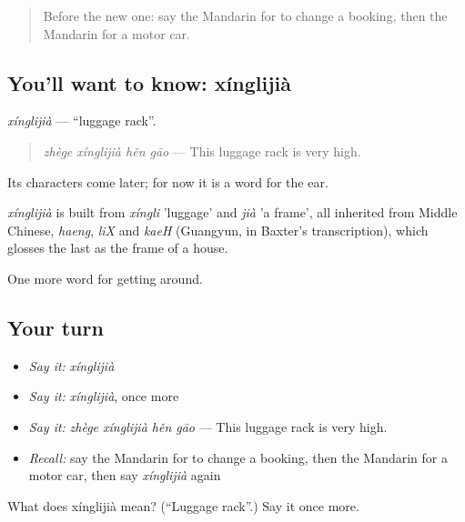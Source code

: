 \label{lesson:ZH-C406-xinglijia}



\begin{quote}
Before the new one: say the Mandarin for to change a booking, then the Mandarin for a motor car.
\end{quote}

\subsection*{You'll want to know: xínglijià}
\emph{xínglijià} — \textquotedblleft{}luggage rack\textquotedblright{}.

\begin{quote}
\emph{zhège xínglijià hěn gāo} — This luggage rack is very high.
\end{quote}

Its characters come later; for now it is a word for the ear.

\begin{cousinweb}
\emph{xínglijià} is built from \emph{xíngli} 'luggage' and \emph{jià} 'a frame', all inherited from Middle Chinese, \emph{haeng}, \emph{liX} and \emph{kaeH} (Guangyun, in Baxter's transcription), which glosses the last as the frame of a house.
\end{cousinweb}

\begin{grammarlens}[title={What you've built}]
One more word for getting around.
\end{grammarlens}

\subsection*{Your turn}
\begin{itemize}
\raggedright
  \item \emph{Say it:} \emph{xínglijià}
  \item \emph{Say it:} \emph{xínglijià}, once more
  \item \emph{Say it:} \emph{zhège xínglijià hěn gāo} — This luggage rack is very high.
  \item \emph{Recall:} say the Mandarin for to change a booking, then the Mandarin for a motor car, then say \emph{xínglijià} again
\end{itemize}

\begin{tcolorbox}[breakable,colback=teal!4,colframe=teal!35!black,title={Before you move on}]
What does xínglijià mean? (\textquotedblleft{}Luggage rack\textquotedblright{}.) Say it once more.
\end{tcolorbox}
